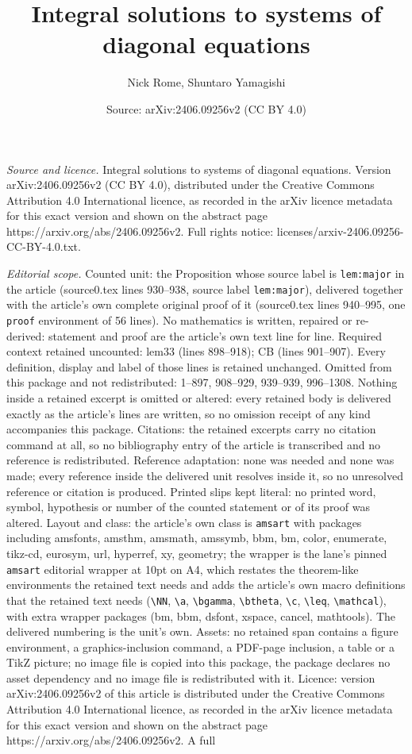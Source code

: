 \documentclass[10pt,a4paper]{amsart}
\title[Integral solutions to systems of diagonal equations]{Integral solutions to systems of diagonal equations}
\author{Nick Rome, Shuntaro Yamagishi}
\date{Source: arXiv:2406.09256v2 (CC BY 4.0)}
\numberwithin{equation}{section}
\begin{document}
\maketitle

\noindent\emph{Source and licence.} Integral solutions to systems of diagonal equations. Version arXiv:2406.09256v2 (CC BY 4.0), distributed under the Creative Commons Attribution 4.0 International licence, as recorded in the arXiv licence metadata for this exact version and shown on the abstract page https://arxiv.org/abs/2406.09256v2. Full rights notice: licenses/arxiv-2406.09256-CC-BY-4.0.txt.\par\smallskip

\noindent\textit{Editorial scope.} Counted unit: the Proposition whose source label is \texttt{lem:major} in the article (source0.tex lines 930--938, source label \texttt{lem:major}), delivered together with the article's own complete original proof of it (source0.tex lines 940--995, one \texttt{proof} environment of 56 lines). No mathematics is written, repaired or re-derived: statement and proof are the article's own text line for line. Required context retained uncounted: lem33 (lines 898--918); CB (lines 901--907). Every definition, display and label of those lines is retained unchanged. Omitted from this package and not redistributed: 1--897, 908--929, 939--939, 996--1308. Nothing inside a retained excerpt is omitted or altered: every retained body is delivered exactly as the article's lines are written, so no omission receipt of any kind accompanies this package. Citations: the retained excerpts carry no citation command at all, so no bibliography entry of the article is transcribed and no reference is redistributed. Reference adaptation: none was needed and none was made; every reference inside the delivered unit resolves inside it, so no unresolved reference or citation is produced. Printed slips kept literal: no printed word, symbol, hypothesis or number of the counted statement or of its proof was altered. Layout and class: the article's own class is \texttt{amsart} with packages including amsfonts, amsthm, amsmath, amssymb, bbm, bm, color, enumerate, tikz-cd, eurosym, url, hyperref, xy, geometry; the wrapper is the lane's pinned \texttt{amsart} editorial wrapper at 10pt on A4, which restates the theorem-like environments the retained text needs and adds the article's own macro definitions that the retained text needs (\texttt{\textbackslash NN}, \texttt{\textbackslash a}, \texttt{\textbackslash bgamma}, \texttt{\textbackslash btheta}, \texttt{\textbackslash c}, \texttt{\textbackslash leq}, \texttt{\textbackslash mathcal}), with extra wrapper packages (bm, bbm, dsfont, xspace, cancel, mathtools). The delivered numbering is the unit's own. Assets: no retained span contains a figure environment, a graphics-inclusion command, a PDF-page inclusion, a table or a TikZ picture; no image file is copied into this package, the package declares no asset dependency and no image file is redistributed with it. Licence: version arXiv:2406.09256v2 of this article is distributed under the Creative Commons Attribution 4.0 International licence, as recorded in the arXiv licence metadata for this exact version and shown on the abstract page https://arxiv.org/abs/2406.09256v2. A full 
\end{document}
